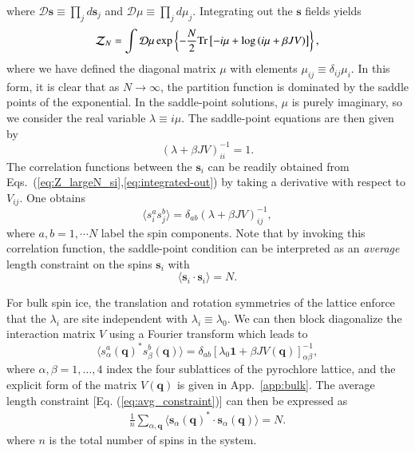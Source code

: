 \documentclass[aps,prx,reprint,runinaddress,superscriptaddress,amsmath,amssymb,floatfix,longbibliography]{revtex4-1}
\def \la {\langle}
\def \ra {\rangle}
\renewcommand{\vec}[1]{\boldsymbol{#1}}
\newcommand{\mat}[1]{#1}
\newcommand{\matone}{\vec{1}}
\newcommand{\lambdabulk}{\lambda_0}
\newcommand{\cc}[1]{{#1}^*}
\begin{document}
where $\mathcal{D}\vec{s} \equiv \prod_j d\vec{s}_j$ and $\mathcal{D}\mu \equiv \prod_j d\mu_j$.
Integrating out the $\vec{s}$ fields yields
%
\begin{equation}
\mathcal{Z}_N = \int \mathcal{D} \mu
\exp\left\{
-\frac{N}{2} {\rm Tr}\left[-i\mu + \log\left(
i\mat{\mu} + \beta J \mat{V}\right)
\right]
\right\},
\label{eq:integrated-out}
\end{equation}
where we have defined the diagonal matrix $\mat{\mu}$ with elements ${\mu}_{ij} \equiv \delta_{ij}\mu_i$. In this form, it is clear that as $N \rightarrow \infty$, the partition function
is dominated by the saddle points of the exponential. In the saddle-point solutions, $\mu$ is purely imaginary, so we consider the real variable $\lambda \equiv i\mu$. The saddle-point equations are then given by
\begin{equation}
(\mat{\lambda} + \beta J \mat{V})^{-1}_{ii} = 1.
\end{equation}
The correlation functions between the $\vec{s}_i$ can be readily obtained from Eqs.~(\ref{eq:Z_largeN_si},\ref{eq:integrated-out}) by taking a derivative with respect to $V_{ij}$. One obtains
\begin{equation}
\label{eq:ss-correlation}
    \langle s^a_i s^b_j\rangle = 
    \delta_{ab} (\mat{\lambda} + \beta J \mat{V})^{-1}_{ij},
\end{equation}
where $a,b = 1, \cdots N$ label the spin components. Note that by invoking this correlation function, the saddle-point condition can be interpreted as an \emph{average} length constraint on the spins $\vec{s}_i$ with
\begin{equation}
\la \vec{s}_i \cdot \vec{s}_i \ra = N.
\label{eq:avg_constraint}
\end{equation}

For bulk spin ice, the translation and rotation symmetries of the lattice enforce that the $\lambda_i$ are site independent with $\lambda_i \equiv \lambdabulk$. We can then block diagonalize the  interaction matrix $V$ using a Fourier transform which leads to
\begin{equation}	
\la \cc{s^a_\alpha({\vec{q}})} s^b_\beta({\vec{q}})\ra =\delta_{ab} \left[ \lambdabulk \matone + \beta J \mat{V}({\vec{q}}) \right]^{-1}_{\alpha \beta} ,
\label{eq:correlations_qspace}
\end{equation}
%
where $\alpha, \beta = 1,\dots,4$ index the four sublattices of the pyrochlore lattice, and the explicit form of the matrix $\mat{V}(\vec{q})$ is given in App.~\ref{app:bulk}. The average length constraint [Eq. (\ref{eq:avg_constraint})] can then be expressed as
%
\begin{align}
\frac{1}{n}\sum_{\alpha, {\vec{q}}} \la \cc{\vec{s}_\alpha({\vec{q}})}\cdot \vec{s}_\alpha({\vec{q}})\ra = N . 
\label{eq:selfconsistency_qspace}
\end{align}
%
where $n$ is the total number of spins in the system.
\end{document}
